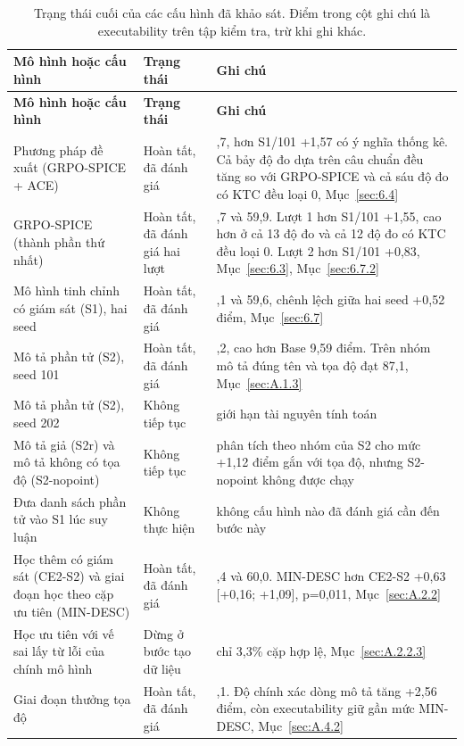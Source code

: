 {\footnotesize
\begin{longtable}{@{}>{\raggedright\arraybackslash}p{}>{\raggedright\arraybackslash}p{}>{\raggedright\arraybackslash}p{}@{}}
\caption[Trạng thái cuối của các cấu hình đã khảo sát.]{Trạng thái cuối của các cấu hình đã khảo sát. Điểm trong cột ghi chú là executability trên tập kiểm tra, trừ khi ghi khác.}\label{tab:A.status}\\
\toprule
\textbf{Mô hình hoặc cấu hình} & \textbf{Trạng thái} & \textbf{Ghi chú} \\
\midrule
\endfirsthead
\toprule
\textbf{Mô hình hoặc cấu hình} & \textbf{Trạng thái} & \textbf{Ghi chú} \\
\midrule
\endhead
\bottomrule
\endlastfoot
Phương pháp đề xuất (GRPO-SPICE + ACE) & Hoàn tất, đã đánh giá & 60,7, hơn S1/101 +1,57 có ý nghĩa thống kê. Cả bảy độ đo dựa trên câu chuẩn đều tăng so với GRPO-SPICE và cả sáu độ đo có KTC đều loại 0, Mục~\ref{sec:6.4} \\
GRPO-SPICE (thành phần thứ nhất) & Hoàn tất, đã đánh giá hai lượt & 60,7 và 59,9. Lượt 1 hơn S1/101 +1,55, cao hơn ở cả 13 độ đo và cả 12 độ đo có KTC đều loại 0. Lượt 2 hơn S1/101 +0,83, Mục~\ref{sec:6.3}, Mục~\ref{sec:6.7.2} \\
Mô hình tinh chỉnh có giám sát (S1), hai seed & Hoàn tất, đã đánh giá & 59,1 và 59,6, chênh lệch giữa hai seed +0,52 điểm, Mục~\ref{sec:6.7} \\
Mô tả phần tử (S2), seed 101 & Hoàn tất, đã đánh giá & 57,2, cao hơn Base 9,59 điểm. Trên nhóm mô tả đúng tên và tọa độ đạt 87,1, Mục~\ref{sec:A.1.3} \\
Mô tả phần tử (S2), seed 202 & Không tiếp tục & giới hạn tài nguyên tính toán \\
Mô tả giả (S2r) và mô tả không có tọa độ (S2-nopoint) & Không tiếp tục & phân tích theo nhóm của S2 cho mức +1,12 điểm gắn với tọa độ, nhưng S2-nopoint không được chạy \\
Đưa danh sách phần tử vào S1 lúc suy luận & Không thực hiện & không cấu hình nào đã đánh giá cần đến bước này \\
Học thêm có giám sát (CE2-S2) và giai đoạn học theo cặp ưu tiên (MIN-DESC) & Hoàn tất, đã đánh giá & 59,4 và 60,0. MIN-DESC hơn CE2-S2 +0,63 [+0,16; +1,09], p=0,011, Mục~\ref{sec:A.2.2} \\
Học ưu tiên với vế sai lấy từ lỗi của chính mô hình & Dừng ở bước tạo dữ liệu & chỉ 3,3\% cặp hợp lệ, Mục~\ref{sec:A.2.2.3} \\
Giai đoạn thưởng tọa độ & Hoàn tất, đã đánh giá & 60,1. Độ chính xác dòng mô tả tăng +2,56 điểm, còn executability giữ gần mức MIN-DESC, Mục~\ref{sec:A.4.2} \\

\end{longtable}}
